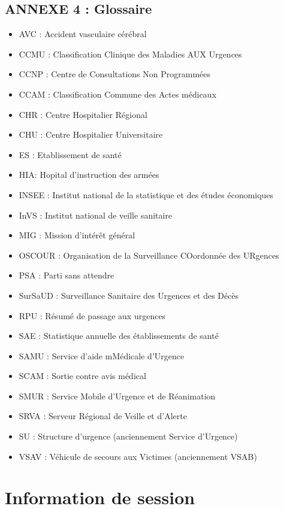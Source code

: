 \documentclass[]{article}
\begin{document}
\subsection{ANNEXE 4 : Glossaire}\label{annexe-4-glossaire}

\begin{itemize}
\itemsep1pt\parskip0pt
\item
  AVC : Accident vasculaire cérébral
\item
  CCMU : Classification Clinique des Maladies AUX Urgences
\item
  CCNP : Centre de Consultations Non Programmées
\item
  CCAM : Classification Commune des Actes médicaux
\item
  CHR : Centre Hospitalier Régional
\item
  CHU : Centre Hospitalier Universitaire
\item
  ES : Etablissement de santé
\item
  HIA: Hopital d'instruction des armées
\item
  INSEE : Institut national de la statistique et des études économiques
\item
  InVS : Institut national de veille sanitaire
\item
  MIG : Mission d'intérêt général
\item
  OSCOUR : Organisation de la Surveillance COordonnée des URgences
\item
  PSA : Parti sans attendre
\item
  SurSaUD : Surveillance Sanitaire des Urgences et des Décès
\item
  RPU : Résumé de passage aux urgences
\item
  SAE : Statistique annuelle des établissements de santé
\item
  SAMU : Service d'aide mMédicale d'Urgence
\item
  SCAM : Sortie contre avis médical
\item
  SMUR : Service Mobile d'Urgence et de Réanimation
\item
  SRVA : Serveur Régional de Veille et d'Alerte
\item
  SU : Structure d'urgence (anciennement Service d'Urgence)
\item
  VSAV : Véhicule de secours aux Victimes (anciennement VSAB)
\end{itemize}

\section{Information de session}\label{information-de-session}
\end{document}
